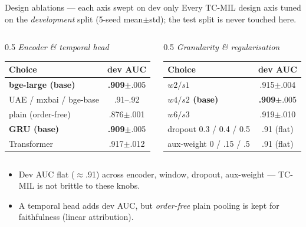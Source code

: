\documentclass[10pt,aspectratio=169]{beamer}
\newcommand{\good}[1]{\textcolor{mGood}{#1}}
\begin{document}
\begin{frame}{Design ablations --- each axis swept on dev only}
  Every TC-MIL design axis tuned on the \emph{development} split (5-seed mean$\pm$std);
  the test split is never touched here.
  \begin{columns}[T]
    \begin{column}{0.5\textwidth}\footnotesize
      \textit{Encoder \& temporal head}
      \begin{tabular}{@{}lc@{}}
        \toprule
        \textbf{Choice} & \textbf{dev AUC} \\
        \midrule
        \textbf{bge-large (base)} & \textbf{.909}{\tiny$\pm$.005} \\
        UAE / mxbai / bge-base & .91--.92 \\
        \midrule
        plain (order-free) & .876{\tiny$\pm$.001} \\
        \textbf{GRU (base)} & \textbf{.909}{\tiny$\pm$.005} \\
        Transformer & .917{\tiny$\pm$.012} \\
        \bottomrule
      \end{tabular}
    \end{column}
    \begin{column}{0.5\textwidth}\footnotesize
      \textit{Granularity \& regularisation}
      \begin{tabular}{@{}lc@{}}
        \toprule
        \textbf{Choice} & \textbf{dev AUC} \\
        \midrule
        $w2/s1$ & .915{\tiny$\pm$.004} \\
        \textbf{$w4/s2$ (base)} & \textbf{.909}{\tiny$\pm$.005} \\
        $w6/s3$ & .919{\tiny$\pm$.010} \\
        \midrule
        dropout 0.3 / 0.4 / 0.5 & .91 (flat) \\
        aux-weight 0 / .15 / .5 & .91 (flat) \\
        \bottomrule
      \end{tabular}
    \end{column}
  \end{columns}
  \vspace{1mm}
  \begin{itemize}\small
    \item Dev AUC \good{flat ($\approx$.91)} across encoder, window, dropout, aux-weight ---
          \good{TC-MIL is not brittle} to these knobs.
    \item A temporal head adds dev AUC, but \emph{order-free} plain pooling is kept for
          \good{faithfulness} (linear attribution).
  \end{itemize}
\end{frame}
\end{document}
